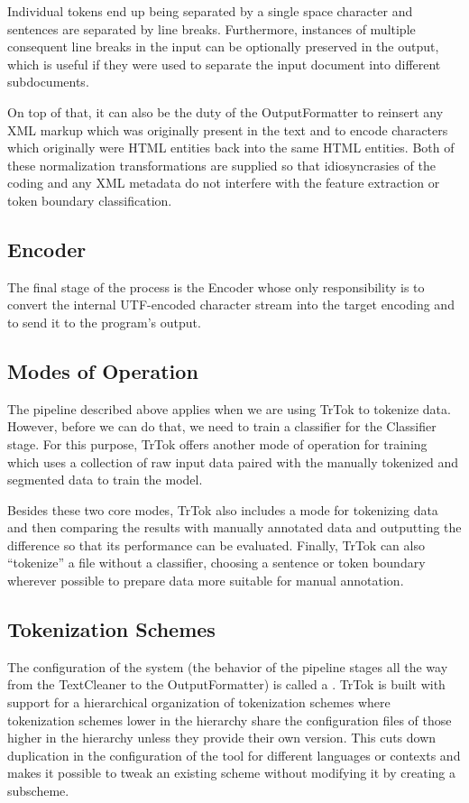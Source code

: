 Individual tokens end up being separated by a single space character
and sentences are separated by line breaks. Furthermore, instances of
multiple consequent line breaks in the input can be optionally
preserved in the output, which is useful if they were used to separate
the input document into different subdocuments.

On top of that, it can also be the duty of the OutputFormatter to
reinsert any XML markup which was originally present in the text and
to encode characters which originally were HTML entities back into the
same HTML entities. Both of these normalization transformations are
supplied so that idiosyncrasies of the coding and any XML metadata do
not interfere with the feature extraction or token boundary
classification.

\subsection{Encoder}

The final stage of the process is the Encoder whose only
responsibility is to convert the internal UTF-encoded character
stream into the target encoding and to send it to the program's output.

\subsection{Modes of Operation}

The pipeline described above applies when we are using TrTok to
tokenize data. However, before we can do that, we need to train a
classifier for the Classifier stage. For this purpose, TrTok offers
another mode of operation for training which uses a collection of raw
input data paired with the manually tokenized and segmented data to
train the model.

Besides these two core modes, TrTok also includes a mode for
tokenizing data and then comparing the results with manually annotated
data and outputting the difference so that its performance can be
evaluated. Finally, TrTok can also ``tokenize'' a file without a
classifier, choosing a sentence or token boundary wherever possible to
prepare data more suitable for manual annotation.

\subsection{Tokenization Schemes}

The configuration of the system (the behavior of the pipeline stages
all the way from the TextCleaner to the OutputFormatter) is called a
. TrTok is built with support for a
hierarchical organization of tokenization schemes where tokenization
schemes lower in the hierarchy share the configuration files of those
higher in the hierarchy unless they provide their own version. This
cuts down duplication in the configuration of the tool for different
languages or contexts and makes it possible to tweak an existing
scheme without modifying it by creating a subscheme.
